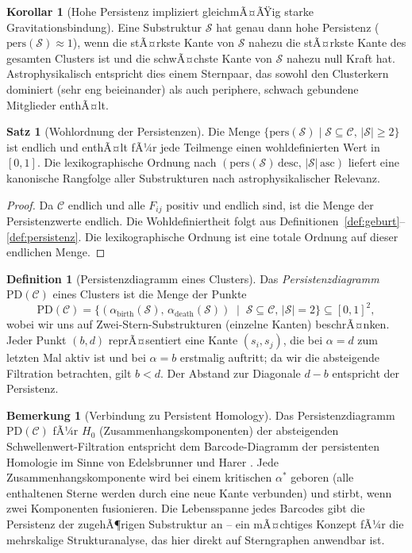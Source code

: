 ﻿\documentclass[a4paper,12pt]{report}
\theoremstyle{definition}
\newtheorem{definition}{Definition}
\newtheorem{satz}{Satz}
\newtheorem{bemerkung}{Bemerkung}
\newtheorem{korollar}{Korollar}
\begin{document}
\begin{korollar}[Hohe Persistenz impliziert gleichmÃ¤ÃŸig starke Gravitationsbindung]
\label{kor:persistenz}
Eine Substruktur $\mathcal{S}$ hat genau dann hohe Persistenz ($\mathrm{pers}(\mathcal{S}) \approx 1$), wenn die stÃ¤rkste Kante von $\mathcal{S}$ nahezu die stÃ¤rkste Kante des gesamten Clusters ist und die schwÃ¤chste Kante von $\mathcal{S}$ nahezu null Kraft hat. Astrophysikalisch entspricht dies einem Sternpaar, das sowohl den Clusterkern dominiert (sehr eng beieinander) als auch periphere, schwach gebundene Mitglieder enthÃ¤lt.
\end{korollar}

\begin{satz}[Wohlordnung der Persistenzen]
\label{satz:wohlordnung}
Die Menge $\{\mathrm{pers}(\mathcal{S}) \mid \mathcal{S} \subseteq \mathcal{C},\, |\mathcal{S}| \geq 2\}$ ist endlich und enthÃ¤lt fÃ¼r jede Teilmenge einen wohldefinierten Wert in $[0,1]$. Die lexikographische Ordnung nach $(\mathrm{pers}(\mathcal{S})\, \text{desc},\, |\mathcal{S}|\, \text{asc})$ liefert eine kanonische Rangfolge aller Substrukturen nach astrophysikalischer Relevanz.
\end{satz}

\begin{proof}
Da $\mathcal{C}$ endlich und alle $F_{ij}$ positiv und endlich sind, ist die Menge der Persistenzwerte endlich. Die Wohldefiniertheit folgt aus Definitionen~\ref{def:geburt}--\ref{def:persistenz}. Die lexikographische Ordnung ist eine totale Ordnung auf dieser endlichen Menge.
\end{proof}

\begin{definition}[Persistenzdiagramm eines Clusters]
\label{def:persistenzdiagramm}
Das \emph{Persistenzdiagramm} $\mathrm{PD}(\mathcal{C})$ eines Clusters ist die Menge der Punkte
\[
\mathrm{PD}(\mathcal{C}) = \bigl\{(\alpha_\mathrm{birth}(\mathcal{S}),\, \alpha_\mathrm{death}(\mathcal{S})) \;\mid\; \mathcal{S} \subseteq \mathcal{C},\, |\mathcal{S}| = 2\bigr\}
\subseteq [0,1]^2,
\]
wobei wir uns auf Zwei-Stern-Substrukturen (einzelne Kanten) beschrÃ¤nken. Jeder Punkt $(b, d)$ reprÃ¤sentiert eine Kante $(s_i, s_j)$, die bei $\alpha = d$ zum letzten Mal aktiv ist und bei $\alpha = b$ erstmalig auftritt; da wir die absteigende Filtration betrachten, gilt $b < d$. Der Abstand zur Diagonale $d - b$ entspricht der Persistenz.
\end{definition}

\begin{bemerkung}[Verbindung zu Persistent Homology]
Das Persistenzdiagramm $\mathrm{PD}(\mathcal{C})$ fÃ¼r $H_0$ (Zusammenhangskomponenten) der absteigenden Schwellenwert-Filtration entspricht dem Barcode-Diagramm der persistenten Homologie im Sinne von Edelsbrunner und Harer \cite{edelsbrunner2010}. Jede Zusammenhangskomponente wird bei einem kritischen $\alpha^*$ geboren (alle enthaltenen Sterne werden durch eine neue Kante verbunden) und stirbt, wenn zwei Komponenten fusionieren. Die Lebensspanne jedes Barcodes gibt die Persistenz der zugehÃ¶rigen Substruktur an -- ein mÃ¤chtiges Konzept fÃ¼r die mehrskalige Strukturanalyse, das hier direkt auf Sterngraphen anwendbar ist.
\end{bemerkung}
\end{document}
